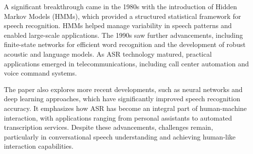 A significant breakthrough came in the 1980s with the introduction of Hidden Markov Models (HMMs), which provided a structured statistical framework for speech recognition. HMMs helped manage variability in speech patterns and enabled large-scale applications. The 1990s saw further advancements, including finite-state networks for efficient word recognition and the development of robust acoustic and language models. As ASR technology matured, practical applications emerged in telecommunications, including call center automation and voice command systems.

The paper also explores more recent developments, such as neural networks and deep learning approaches, which have significantly improved speech recognition accuracy. It emphasizes how ASR has become an integral part of human-machine interaction, with applications ranging from personal assistants to automated transcription services. Despite these advancements, challenges remain, particularly in conversational speech understanding and achieving human-like interaction capabilities.